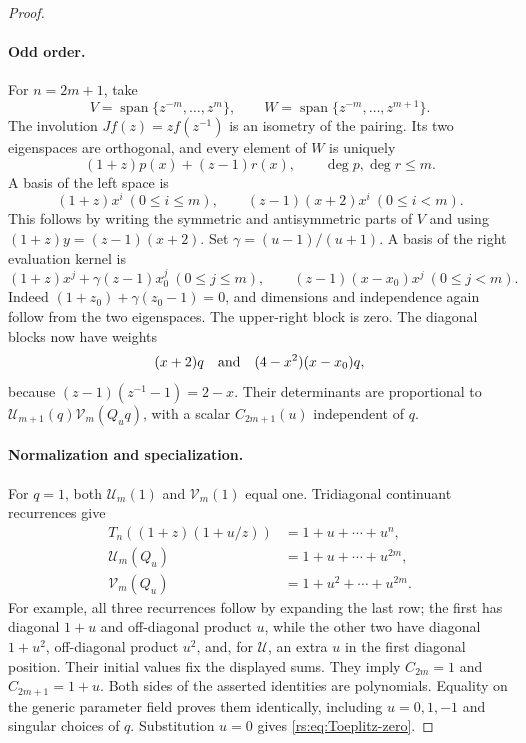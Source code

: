 \documentclass[11pt]{article}
\theoremstyle{definition}
\theoremstyle{remark}
\newcommand{\UU}{\mathcal U}
\newcommand{\VV}{\mathcal V}
\theoremstyle{definition}
\theoremstyle{plain}
\numberwithin{equation}{section}
\begin{document}
\begin{proof}
\paragraph{Odd order.}
For $n=2m+1$, take
\[
 V=\operatorname{span}\{z^{-m},\ldots,z^m\},\qquad
 W=\operatorname{span}\{z^{-m},\ldots,z^{m+1}\}.
\]
The involution $Jf(z)=zf(z^{-1})$ is an isometry of the pairing.
Its two eigenspaces are orthogonal, and every element of $W$ is uniquely
\[
 (1+z)p(x)+(z-1)r(x),\qquad \deg p,\deg r\le m.
\]
A basis of the left space is
\[
 (1+z)x^i\ (0\le i\le m),\qquad
 (z-1)(x+2)x^i\ (0\le i<m).
\]
This follows by writing the symmetric and antisymmetric parts of $V$ and
using $(1+z)y=(z-1)(x+2)$.
Set $\gamma=(u-1)/(u+1)$. A basis of the right evaluation kernel is
\[
 (1+z)x^j+\gamma(z-1)x_0^j\ (0\le j\le m),\qquad
 (z-1)(x-x_0)x^j\ (0\le j<m).
\]
Indeed $(1+z_0)+\gamma(z_0-1)=0$, and dimensions and independence again
follow from the two eigenspaces. The upper-right block is zero. The diagonal
blocks now have weights
\[
 (x+2)q\quad\hbox{and}\quad(4-x^2)(x-x_0)q,
\]
because $(z-1)(z^{-1}-1)=2-x$. Their determinants are proportional to
$\UU_{m+1}(q)\VV_m(Q_uq)$, with a scalar $C_{2m+1}(u)$ independent of $q$.

\paragraph{Normalization and specialization.}
For $q=1$, both $\UU_m(1)$ and $\VV_m(1)$ equal one. Tridiagonal
continuant recurrences give
\begin{align*}
 T_n((1+z)(1+u/z))&=1+u+\cdots+u^n,\\
 \UU_m(Q_u)&=1+u+\cdots+u^{2m},\\
 \VV_m(Q_u)&=1+u^2+\cdots+u^{2m}.
\end{align*}
For example, all three recurrences follow by expanding the last row; the
first has diagonal $1+u$ and off-diagonal product $u$, while the other two
have diagonal $1+u^2$, off-diagonal product $u^2$, and, for $\UU$, an extra
$u$ in the first diagonal position. Their initial values fix the displayed
sums. They imply $C_{2m}=1$ and $C_{2m+1}=1+u$.
Both sides of the asserted identities are polynomials. Equality on the
generic parameter field proves them identically, including $u=0,1,-1$ and
singular choices of $q$. Substitution $u=0$ gives
\eqref{rs:eq:Toeplitz-zero}.
\end{proof}
\end{document}
